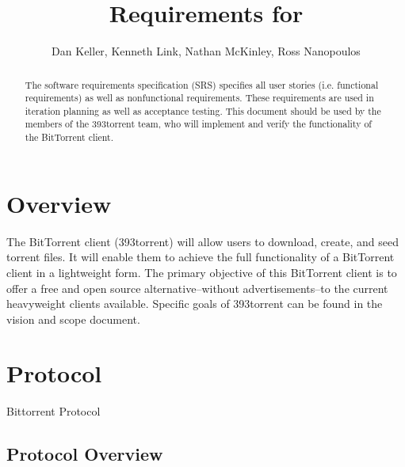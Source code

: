 \documentclass[letter]{scrartcl}
\newcommand{\app}{\sc{393torrent}}
\begin{document}
\title{Requirements for \app}
\subtitle{Dan Keller, Kenneth Link, Nathan McKinley, Ross Nanopoulos}
\date{} %

\maketitle

\begin{abstract}

The software requirements specification (SRS) specifies all user stories (i.e. functional requirements) as well as nonfunctional requirements. These requirements are used in iteration planning as well as acceptance testing.  This document should be used by the members of the 393torrent team, who will implement and verify the functionality of the BitTorrent client.
\end{abstract}

\tableofcontents
\pagebreak

\section{Overview}
The BitTorrent client (393torrent) will allow users to download, create, and seed torrent files.  It will enable them to achieve the full functionality of a BitTorrent client in a lightweight form.  The primary objective of this BitTorrent client is to offer a free and open source alternative--without advertisements--to the current heavyweight clients available.  Specific goals of 393torrent can be found in the vision and scope document.

\section{Protocol}
Bittorrent Protocol

\subsection{Protocol Overview}
	
\end{document}
